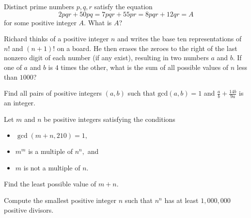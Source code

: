 \documentclass[mast]{lucky}
\begin{document}
\begin{prob}[HMMT 2018]{4}
Distinct prime numbers $p,q,r$ satisfy the equation $$2pqr + 50pq = 7pqr + 55pr = 8pqr + 12qr  =A$$ for some positive integer $A$. What is $A$?
\end{prob}

\begin{prob}[DMC 10C 2021/21]{6}
    Richard thinks of a positive integer $n$ and writes the base ten representations of $n!$ and $(n+1)!$ on a board. He then erases the zeroes to the right of the last nonzero digit of each number (if any exist), resulting in two numbers $a$ and $b$. If one of $a$ and $b$ is $4$ times the other, what is the sum of all possible values of $n$ less than $1000$?
\end{prob}

\begin{prob}[AMC 12B 2007/24]{6}
Find all pairs of positive integers $(a,b)$ such that $\text{gcd}(a,b)=1$ and $\frac{a}{b} + \frac{14b}{9a}$ is an integer.
\end{prob}

\begin{prob}[AIME I 2020/10]{6}
Let $m$ and $n$ be positive integers satisfying the conditions
\begin{itemize}
\item $\gcd(m+n,210)=1,$

\item $m^m$ is a multiple of $n^n,$ and

\item $m$ is not a multiple of $n.$
\end{itemize}
Find the least possible value of $m+n.$
\end{prob}

\begin{prob}[ARML 2010]{6}
Compute the smallest positive integer $n$ such that $n^n$ has at least $1,000,000$ positive divisors.
\end{prob}

\end{document}
